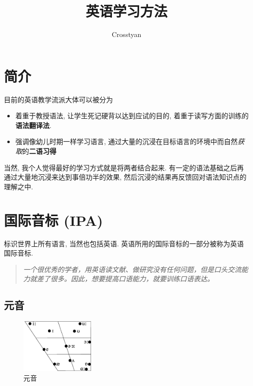 \documentclass[a4paper]{article}
\title{英语学习方法}
\author{Crosstyan}
\begin{document}
\maketitle
\section{简介}
目前的英语教学流派大体可以被分为
\begin{itemize}
  \item 着重于教授语法, 让学生死记硬背以达到应试的目的, 着重于读写方面的训练的\textbf{语法翻译法}. 
  \item 强调像幼儿时期一样学习语言, 通过大量的沉浸在目标语言的环境中而自然\textit{获取}的\textbf{二语习得}
\end{itemize}
\par 当然, 我个人觉得最好的学习方式就是将两者结合起来. 有一定的语法基础之后再通过大量地沉浸来达到事倍功半的效果, 然后沉浸的结果再反馈回对语法知识点的理解之中. 
\section{国际音标 (IPA)}
标识世界上所有语言, 当然也包括英语. 英语所用的国际音标的一部分被称为英语国际音标. 
\begin{quote}
  \textit{一个很优秀的学者，用英语读文献、做研究没有任何问题，但是口头交流能力就差了很多。因此，想要提高口语能力，就要训练口语表达。}
\end{quote}
\subsection{元音}

\begin{figure}[H]
\centering
\includegraphics[width=0.33\textwidth]{vowel.jpg}
\caption{元音}
\end{figure}
\end{document}
